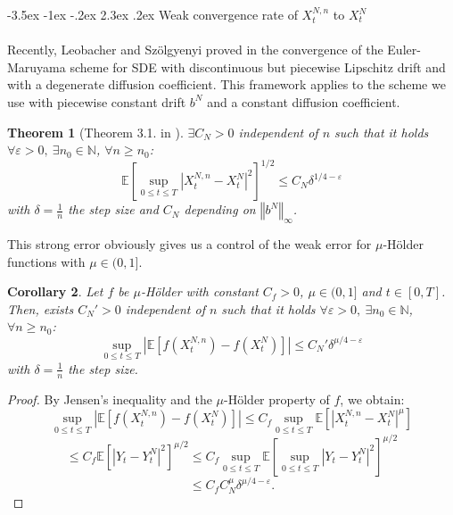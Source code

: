 \documentclass[11pt]{enstaPRE}
\makeatletter
\renewcommand\section{\@startsection {section}{1}{\z@}%
    {-3.5ex \@plus -1ex \@minus -.2ex}%
    {2.3ex \@plus.2ex}%
    {\centering\large\scshape\bfseries}}
\newtheorem{theo}{Theorem}
\newtheorem{cor}[theo]{Corollary}
\newcommand{\norme}[1]{\left\Vert #1\right\Vert}
\newcommand{\N}{\mathbb{N}}
\newcommand{\E}{\mathbb{E}}
\makeatother
\begin{document}
\section{Weak convergence rate of $X_t^{N,n}$ to $X_t^N$}
\paragraph{}
Recently, Leobacher and Szölgyenyi proved in \cite{Leo-Szo} the convergence of the Euler-Maruyama scheme for SDE with discontinuous but piecewise Lipschitz drift and with a degenerate diffusion coefficient. This framework applies to the scheme we use with piecewise constant drift $b^N$ and a constant diffusion coefficient.

\begin{theo}[Theorem 3.1. in \cite{Leo-Szo}]\label{leo}
    $\exists C_N>0$ independent of $n$ such that it holds  $\forall \varepsilon >0,\ \exists n_0\in\N$, $\forall n\geq n_0$:
    \begin{equation}
    \E\left[\underset{0\leq t\leq T}{\sup}\left|X^{N,n}_t-X^N_t\right|^2\right]^{1/2}\leq C_N\delta^{1/4-\varepsilon}
    \end{equation}
    with $\delta=\frac{1}{n}$ the step size and $C_N$ depending on $\norme{b^N}_\infty$.
\end{theo}

This strong error obviously gives us a control of the weak error for $\mu$-Hölder functions with $\mu\in(0,1]$.

\begin{cor}
    Let $f$ be $\mu$-Hölder with constant $C_f>0$, $\mu\in(0,1]$ and $t\in[0,T]$. Then, exists $C_N'>0$ independent of $n$ such that it holds  $\forall \varepsilon >0,\ \exists n_0\in\N$, $\forall n\geq n_0$:
    \begin{equation}
    \underset{0\leq t\leq T}{\sup}\left|\E\left[f\left(X_t^{N,n}\right)-f\left(X_t^N\right)\right]\right| \leq C_N'\delta^{\mu/4-\varepsilon}
    \end{equation}                       
    with $\delta=\frac{1}{n}$ the step size.
\end{cor}

\begin{proof}
    By Jensen's inequality and the $\mu$-Hölder property of $f$, we obtain:
    \begin{equation*}
    \underset{0\leq t\leq T}{\sup}\left|\E\left[f\left(X_t^{N,n}\right)-f\left(X_t^N\right)\right]\right| \leq C_f \underset{0\leq t\leq T}{\sup} \E\left[\left|X_t^{N,n}-X_t^N\right|^\mu\right]
    \end{equation*}
    \begin{equation*}
    \leq  C_f  \E\left[\left|Y_t-Y_t^N\right|^2\right]^{\mu/2} \leq  C_f  \underset{0\leq t\leq T}{\sup}\E\left[\underset{0\leq t\leq T}{\sup}\left|Y_t-Y_t^N\right|^2\right]^{\mu/2}
    \end{equation*}
    \begin{equation*}
    \leq C_f  C_N^\mu\delta^{\mu/4-\varepsilon}.
    \end{equation*}
\end{proof}
\end{document}
